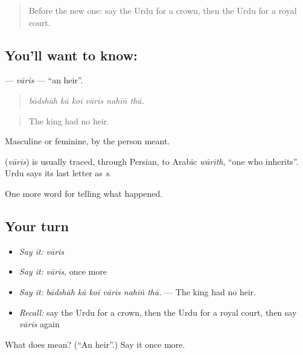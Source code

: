 \label{lesson:UR-C308-varis}



\begin{quote}
Before the new one: say the Urdu for a crown, then the Urdu for a royal court.
\end{quote}

\subsection*{You'll want to know: }
\textbf{} — \emph{vāris} — \textquotedblleft{}an heir\textquotedblright{}.

\begin{quote}
     
\end{quote}

\begin{quote}
\emph{bādshāh kā koī vāris nahīṅ thā.}
\end{quote}

\begin{quote}
The king had no heir.
\end{quote}

Masculine or feminine, by the person meant.

\begin{cousinweb}
\textbf{} (\emph{vāris}) is usually traced, through Persian, to Arabic \emph{wārith}, \textquotedblleft{}one who inherits\textquotedblright{}. Urdu says its last letter as \emph{s}.
\end{cousinweb}

\begin{grammarlens}[title={What you've built}]
One more word for telling what happened.
\end{grammarlens}

\subsection*{Your turn}
\begin{itemize}
\raggedright
  \item \emph{Say it:} \emph{vāris}
  \item \emph{Say it:} \emph{vāris}, once more
  \item \emph{Say it:} \emph{bādshāh kā koī vāris nahīṅ thā.} — The king had no heir.
  \item \emph{Recall:} say the Urdu for a crown, then the Urdu for a royal court, then say \emph{vāris} again
\end{itemize}

\begin{tcolorbox}[breakable,colback=teal!4,colframe=teal!35!black,title={Before you move on}]
What does  mean? (\textquotedblleft{}An heir\textquotedblright{}.) Say it once more.
\end{tcolorbox}
